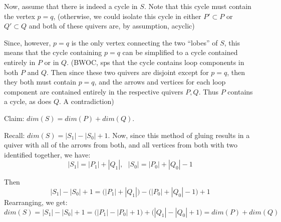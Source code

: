 \documentclass{article}
\begin{document}
\begin{framed}
\begin{center}
\end{center}

Now, assume that there is indeed a cycle in $S$. 
Note that this cycle must contain the vertex $p=q$, 
(otherwise, we could isolate this cycle in either $P'\subset P$ or 
$Q'\subset Q$ and both of these quivers are, by assumption, acyclic)

Since, however, $p=q$ is the only vertex connecting the two ``lobes'' of $S$, 
this means that the cycle containing $p=q$ can be simplified to a cycle 
contained entirely in $P$ or in $Q$. (BWOC, sps that the cycle contains 
loop components in both $P$ and $Q$. Then since these two quivers are 
disjoint except for $p=q$, then they both must contain $p=q$, and 
the arrows and vertices for each loop component are contained entirely in 
the respective quivers $P, Q$. 
Thus $P$ contains a cycle, as does $Q$. A contradiction)
\end{framed}

Claim: $dim(S)=dim(P)+dim(Q)$. \\
\begin{framed}
Recall: $dim(S)=|S_1|-|S_0|+1$. Now, since this method of gluing 
results in a quiver with all of the arrows from both, and 
all vertices from both with two identified together, we have: 
$$|S_1|=|P_1|+|Q_1|, ~~~ |S_0|=|P_0|+|Q_0|-1$$

Then $$|S_1|-|S_0|+1=\big(|P_1|+|Q_1|\big)-
\big(|P_0|+|Q_0|-1\big)+1$$
Rearranging, we get: 
$$dim(S)=|S_1|-|S_0|+1=\big(|P_1|-|P_0|+1\big)+
\big(|Q_1|-|Q_0|+1\big)=dim(P)+dim(Q)$$
\end{framed}
\end{document}
